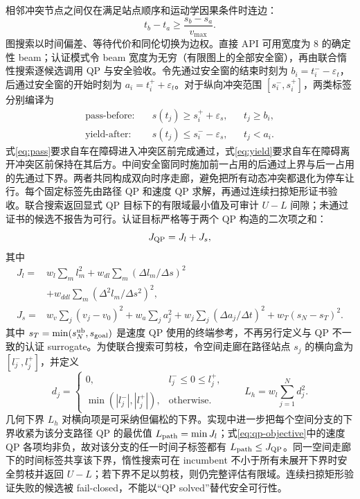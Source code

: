 相邻冲突节点之间仅在满足站点顺序和运动学因果条件时连边：
\begin{equation}
 t_b-t_a\ge \frac{s_b-s_a}{v_{\max}}.
 \label{eq:causal}
\end{equation}
图搜索以时间偏差、等待代价和同伦切换为边权。直接 API 可用宽度为 8 的确定性 beam；认证模式令 beam 宽度为无穷（有限图上的全部安全窗），再由联合惰性搜索逐候选调用 QP 与安全验收。令先通过安全窗的结束时刻为 $b_i=t_i^- -\varepsilon_t$，后通过安全窗的开始时刻为 $a_i=t_i^+ +\varepsilon_t$。对于纵向冲突范围 $[s_i^-,s_i^+]$，两类标签分别编译为
\begin{align}
 \text{pass-before:}&\quad s(t_j)\ge s_i^++\varepsilon_s, &&t_j\ge b_i,\label{eq:pass}\\
 \text{yield-after:}&\quad s(t_j)\le s_i^--\varepsilon_s, &&t_j<a_i .\label{eq:yield}
\end{align}
式\eqref{eq:pass}要求自车在障碍进入冲突区前完成通过，式\eqref{eq:yield}要求自车在障碍离开冲突区前保持在其后方。中间安全窗同时施加前一占用的后通过上界与后一占用的先通过下界。两者共同构成双向时序走廊，避免把所有动态冲突都退化为停车让行。每个固定标签先由路径 QP 和速度 QP 求解，再通过连续扫掠矩形证书验收。联合搜索返回显式 QP 目标下的有限域最小值及可审计 $U-L$ 间隙；未通过证书的候选不报告为可行。认证目标严格等于两个 QP 构造的二次项之和：
\begin{equation}
J_{\rm QP}=J_l+J_s,
\end{equation}
其中
\begin{align}
J_l={}&w_l\sum_m l_m^2+w_{dl}\sum_m(\Delta l_m/\Delta s)^2\\
       &+w_{ddl}\sum_m(\Delta^2 l_m/\Delta s^2)^2,\\
J_s={}&w_v\sum_j(v_j-v_0)^2+w_a\sum_j a_j^2
       +w_j\sum_j(\Delta a_j/\Delta t)^2
       +w_T(s_N-s_T)^2 .
\label{eq:qp-objective}
\end{align}
其中 $s_T=\min(s_N^{\rm ub},s_{\rm goal})$ 是速度 QP 使用的终端参考，不再另行定义与 QP 不一致的认证 surrogate。为使联合搜索可剪枝，令空间走廊在路径站点 $s_j$ 的横向盒为 $[l_j^-,l_j^+]$，并定义
\begin{equation}
 d_j=\begin{cases}0,&l_j^-\leq0\leq l_j^+,\\
 \min(|l_j^-|,|l_j^+|),&\text{otherwise.}\end{cases}
\qquad L_h=w_l\sum_{j=1}^N d_j^2 .
 \label{eq:corridor-lb}
\end{equation}
几何下界 $L_h$ 对横向项是可采纳但偏松的下界。实现中进一步把每个空间分支的下界收紧为该分支路径 QP 的最优值 $L_{\rm path}=\min J_l$；式\eqref{eq:qp-objective}中的速度 QP 各项均非负，故对该分支的任一时间子标签都有 $L_{\rm path}\leq J_{\rm QP}$。同一空间走廊下的时间标签共享该下界，惰性搜索可在 incumbent 不小于所有未展开下界时安全剪枝并返回 $U-L$；若下界不足以剪枝，则仍完整评估有限域。连续扫掠矩形验证失败的候选被 fail-closed，不能以“QP solved”替代安全可行性。

